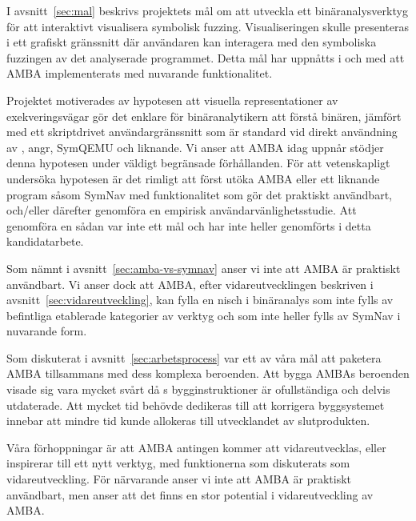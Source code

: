 I avsnitt~\ref{sec:mal} beskrivs projektets mål om att utveckla ett
binäranalysverktyg för att interaktivt visualisera symbolisk fuzzing.
Visualiseringen skulle presenteras i ett grafiskt gränssnitt där användaren kan
interagera med den symboliska fuzzingen av det analyserade programmet. Detta mål
har uppnåtts i och med att AMBA implementerats med nuvarande funktionalitet.

Projektet motiverades av hypotesen att visuella representationer av
exekveringsvägar gör det enklare för binäranalytikern att förstå binären,
jämfört med ett skriptdrivet användargränssnitt som är standard vid direkt
användning av \stoe{}, angr, SymQEMU och liknande. Vi anser att AMBA idag uppnår
stödjer denna hypotesen under väldigt begränsade förhållanden. För att
vetenskapligt undersöka hypotesen är det rimligt att först utöka AMBA eller ett
liknande program såsom SymNav med funktionalitet som gör det praktiskt
användbart, och/eller därefter genomföra en empirisk användarvänlighetsstudie.
Att genomföra en sådan var inte ett mål och har inte heller genomförts i detta
kandidatarbete.

Som nämnt i avsnitt~\ref{sec:amba-vs-symnav} anser vi inte att AMBA är praktiskt
användbart. Vi anser dock att AMBA, efter vidareutvecklingen beskriven i
avsnitt~\ref{sec:vidareutveckling}, kan fylla en nisch i binäranalys som inte
fylls av befintliga etablerade kategorier av verktyg och som inte heller fylls
av SymNav i nuvarande form.

Som diskuterat i avsnitt~\ref{sec:arbetsprocess} var ett av våra mål att
paketera AMBA tillsammans med dess komplexa beroenden. Att bygga AMBAs beroenden
visade sig vara mycket svårt då \stoe{}s bygginstruktioner är ofullständiga och
delvis utdaterade. Att mycket tid behövde dedikeras till att korrigera
byggsystemet innebar att mindre tid kunde allokeras till utvecklandet av
slutprodukten.

Våra förhoppningar är att AMBA antingen kommer att vidareutvecklas, eller
inspirerar till ett nytt verktyg, med funktionerna som diskuterats som
vidareutveckling. För närvarande anser vi inte att AMBA är praktiskt användbart,
men anser att det finns en stor potential i vidareutveckling av AMBA.\@
